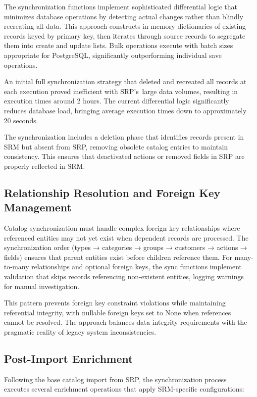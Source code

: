 The synchronization functions implement sophisticated differential logic that minimizes database operations by detecting actual changes rather than blindly recreating all data. This approach constructs in-memory dictionaries of existing records keyed by primary key, then iterates through source records to segregate them into create and update lists. Bulk operations execute with batch sizes appropriate for PostgreSQL, significantly outperforming individual save operations.

An initial full synchronization strategy that deleted and recreated all records at each execution proved inefficient with SRP's~large data volumes, resulting in execution times around 2 hours. The current differential logic significantly reduces database load, bringing average execution times down to approximately 20 seconds.

The synchronization includes a deletion phase that identifies records present in SRM but absent from SRP, removing obsolete catalog entries to maintain consistency. This ensures that deactivated actions or removed fields in SRP are properly reflected in SRM.

\subsection{Relationship Resolution and Foreign Key Management}

Catalog synchronization must handle complex foreign key relationships where referenced entities may not yet exist when dependent records are processed. The synchronization order (types → categories → groups → customers → actions → fields) ensures that parent entities exist before children reference them. For many-to-many relationships and optional foreign keys, the sync functions implement validation that skips records referencing non-existent entities, logging warnings for manual investigation.

This pattern prevents foreign key constraint violations while maintaining referential integrity, with nullable foreign keys set to None when references cannot be resolved. The approach balances data integrity requirements with the pragmatic reality of legacy system inconsistencies.

\subsection{Post-Import Enrichment}

Following the base catalog import from SRP, the synchronization process executes several enrichment operations that apply SRM-specific configurations:

